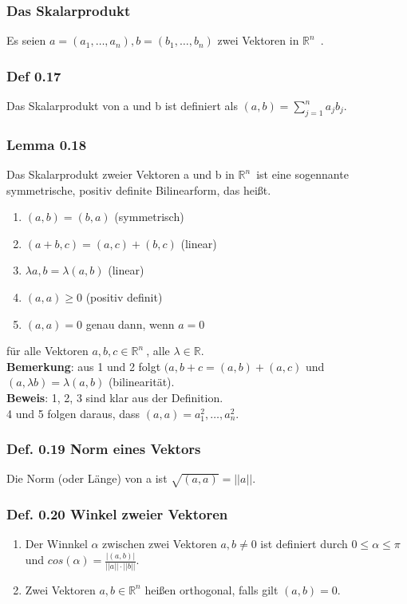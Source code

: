 \documentclass{article}
\newcommand{\lb}{\lambda}
\newcommand{\R}{\mathbb{R}}
\newcommand{\Rn}{\mathbb{R}^n\ }
\newcommand{\mRn}{$\mathbb{R}^n$\ }
\newcommand{\al}{\alpha}
\begin{document}
\subsubsection{Das Skalarprodukt}
Es seien $a = (a_1, \dots, a_n), b = (b_1, \dots, b_n)$ zwei Vektoren in \mRn.\\

\subsubsection{Def 0.17}
Das Skalarprodukt von a und b ist definiert als $(a, b) = \sum_{j=1}^n a_j b_j$.

\subsubsection{Lemma 0.18}
Das Skalarprodukt zweier Vektoren a und b in \mRn ist eine sogennante symmetrische, positiv definite Bilinearform, das hei\ss{}t.
\begin{enumerate}
\item{$(a, b) = (b, a)$ (symmetrisch)}
\item{$(a + b, c) = (a, c) + (b, c)$ (linear)}
\item{$\lb a, b = \lb(a, b)$ (linear)}
\item{$(a, a) \ge 0$ (positiv definit)}
\item{$(a, a) = 0$ genau dann, wenn $a=0$}
\end{enumerate}
für alle Vektoren $a, b, c \in \Rn$, alle $\lb \in \R$.\\
\textbf{Bemerkung}: aus 1 und 2 folgt $(a, b+c = (a,b) + (a,c)$ und $(a, \lb b) = \lb (a, b)$ (bilinearität).\\
\textbf{Beweis}: 1, 2, 3 sind klar aus der Definition.\\
4 und 5 folgen daraus, dass $(a, a) = a_1^2, \dots, a_n^2$.\\

\subsubsection{Def. 0.19 Norm eines Vektors}
Die Norm (oder Länge) von a ist $\sqrt{(a, a)} = ||a||$.

\subsubsection{Def. 0.20 Winkel zweier Vektoren}
\begin{enumerate}
\item {
Der Winnkel $\al$ zwischen zwei Vektoren $a, b \neq 0$ ist definiert durch $0 \le \al \le \pi$ und $cos(\al) = \frac{|(a,b)|}{||a||\cdot ||b||}$.}
\item{
Zwei Vektoren $a, b \in \R^n$ hei\ss{}en orthogonal, falls gilt $(a, b) = 0$.
}
\end{enumerate}
\end{document}
